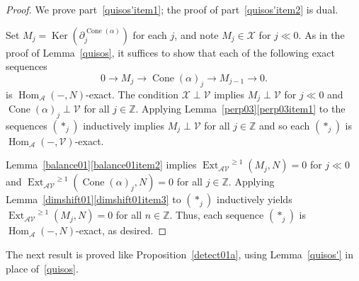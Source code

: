 \documentclass{amsart}
\begin{document}
\begin{proof}
We prove part~\eqref{quisos'item1}; the proof of part~\eqref{quisos'item2} is dual.

Set $M_j={\operatorname{Ker}}(\partial_j^{{\operatorname{Cone}}(\alpha)})$ for each $j$, and note 
$M_j\in{{\mathcal{{X}}}}$ for $j\ll 0$.
As in the proof of Lemma~\ref{quisos},
it suffices to show that each of the following exact sequences
\begin{equation} \label{exacts} \tag{$\ast_j$}
0\to M_j\to {\operatorname{Cone}}(\alpha)_j\to M_{j-1}\to 0.
\end{equation}
is ${{\operatorname{Hom}}_{{\mathcal{{A}}}}}(-,N)$-exact.  
The condition ${{\mathcal{{X}}}}\perp{{\mathcal{{V}}}}$ implies $M_j\perp{{\mathcal{{V}}}}$
for $j\ll 0$ and ${\operatorname{Cone}}(\alpha)_j\perp{{\mathcal{{V}}}}$
for all $j\in{\mathbb{Z}}$.
Applying Lemma~\ref{perp03}\eqref{perp03item1}
to the sequences $(\ast_j)$
inductively implies $M_j\perp{{\mathcal{{V}}}}$ for all $j\in{\mathbb{Z}}$ and so each 
$(\ast_j)$ is ${{\operatorname{Hom}}_{{\mathcal{{A}}}}}(-,{{\mathcal{{V}}}})$-exact.

Lemma~\ref{balance01}\eqref{balance01item2} implies
${{\operatorname{Ext}}_{{{\mathcal{{A}}}}{{\mathcal{{V}}}}}}^{{\geqslant} 1}(M_j,N)=0$ for $j\ll 0$ and 
${{\operatorname{Ext}}_{{{\mathcal{{A}}}}{{\mathcal{{V}}}}}}^{{\geqslant} 1}({\operatorname{Cone}}(\alpha)_j,N)=0$ for all $j\in{\mathbb{Z}}$.
Applying
Lemma~\ref{dimshift01}\eqref{dimshift01item3} to $(\ast_j)$ inductively
yields ${{\operatorname{Ext}}_{{{\mathcal{{A}}}}{{\mathcal{{V}}}}}}^{{\geqslant} 1}(M_j,N)=0$
for all $n\in{\mathbb{Z}}$.  Thus, each sequence $(\ast_j)$ is ${{\operatorname{Hom}}_{{\mathcal{{A}}}}}(-,N)$-exact,
as desired.
\end{proof}

The next result  is proved like Proposition~\ref{detect01a}, 
using Lemma~\ref{quisos'} in place of~\ref{quisos}.
\end{document}
